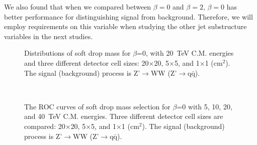 \documentclass[12pt,twoside,a4paper,an,final]{cms-tdr}
\begin{document}
We also found that when we compared between $\beta=0$ and $\beta=2$, $\beta=0$ has better performance for distinguishing signal from background. Therefore, we will 
employ requirements on this variable when studying the other jet substructure variables in the next studies. 
 
\begin{figure}
\begin{center}
\end{center}
\caption{Distributions of soft drop mass for $\beta$=0, with 20~TeV C.M. energies and three different detector cell sizes: 20$\times$20, 
5$\times$5, and 1$\times$1 ($\mathrm{cm}^{2}$). The signal (background) process is 
Z'$\rightarrow$WW (Z'$\rightarrow$q$\bar{\mathrm{q}}$).
\label{fig:cluster_mass_mmdt_ww}}
\end{figure}


\begin{figure}
\begin{center}
  \\
\end{center}
\caption{The ROC curves of soft drop mass selection for $\beta$=0 
with 5, 10, 20, and 40~TeV C.M. energies. 
Three different detector cell sizes are compared: 20$\times$20, 
5$\times$5, and 1$\times$1 ($\mathrm{cm}^{2}$). 
The signal (background) process is Z'$\rightarrow$WW 
(Z'$\rightarrow$q$\bar{\mathrm{q}}$).}
\label{fig:cluster_mass_mmdt_ww_ROC}
\end{figure}
\end{document}
